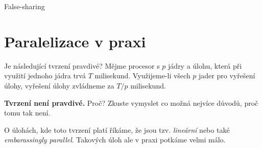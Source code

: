 \documentclass[usenames,dvipsnames,9pt]{beamer}
\newcommand{\see}[1]{\faEye\hspace{5pt}#1}
\begin{document}
\begin{frame}{False-sharing}
  \centering\see{{\tt 3false\_sharing.cpp}}
\end{frame}

\section{Paralelizace v praxi}
\begin{frame}
  \begin{block}{Je následující tvrzení pravdivé?}
    Mějme procesor s $p$ jádry a úlohu, která při využití jednoho jádra trvá $T$ milisekund.
    Využijeme-li všech $p$ jader pro vyřešení úlohy, vyřešení úlohy zvládneme za $T/p$ milisekund.
  \end{block}
  \pause
  \textcolor{BrickRed}{\bf Tvrzení není pravdivé.} Proč? Zkuste vymyslet co možná nejvíce důvodů, proč tomu tak není.

  \pause\vspace{1.5em}
  O úlohách, kde toto tvrzení platí říkáme, že jsou tzv. \emph{lineární} nebo také \emph{embarassingly parallel}. Takových úloh ale v praxi potkáme velmi málo.
\end{frame}
\end{document}

